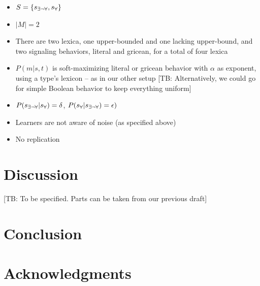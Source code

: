 \documentclass[10pt,a4paper]{article}
\newcommand{\tb}[1]{\textcolor[rgb]{.8,.33,.0}{[TB: #1]}}%
\newcommand{\state}{\ensuremath{s}\xspace}		%
\newcommand{\mystate}[1]{\ensuremath{\state_{\text{#1}}}\xspace} %
\newcommand{\ssome}{\mystate{\ensuremath{\exists\neg\forall}}}
\newcommand{\sall}{\mystate{\ensuremath{\forall}}}
\begin{document}
\begin{itemize}
  \item $S = \{\ssome, \sall\}$
  \item $|M| = 2$
  \item There are two lexica, one upper-bounded and one lacking upper-bound, and two signaling behaviors, literal and gricean, for a total of four lexica
  \item $P(m|s,t)$ is soft-maximizing literal or gricean behavior with $\alpha$ as exponent, using a type's lexicon -- as in our other setup \tb{Alternatively, we could go for simple Boolean behavior to keep everything uniform}
  \item $P(\ssome|\sall) = \delta$, $P(\sall|\ssome) = \epsilon)$
  \item Learners are not aware of noise (as specified above)
  \item No replication
\end{itemize}



\section{Discussion}
\tb{To be specified. Parts can be taken from our previous draft} 

\section{Conclusion}


\section{Acknowledgments}





\setlength{\bibleftmargin}{.125in}
\setlength{\bibindent}{-\bibleftmargin}


\end{document}

